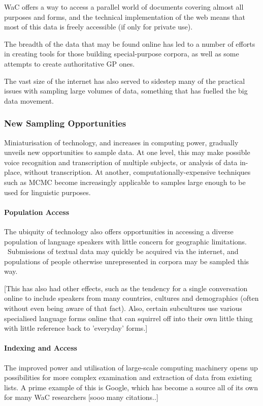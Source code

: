 WaC offers a way to access a parallel world of documents covering almost all purposes and forms, and the technical implementation of the web means that most of this data is freely accessible (if only for private use).

The breadth of the data that may be found online has led to a number of efforts in creating tools for those building special-purpose corpora, as well as some attempts to create authoritative GP ones.

The vast size of the internet has also served to sidestep many of the practical issues with sampling large volumes of data, something that has fuelled the big data movement.  




\subsubsection{New Sampling Opportunities}
Miniaturisation of technology, and increases in computing power, gradually unveils new opportunities to sample data.  At one level, this may make possible voice recognition and transcription of multiple subjects, or analysis of data in-place, without transcription.  At another, computationally-expensive techniques such as MCMC become increasingly applicable to samples large enough to be used for linguistic purposes.


\paragraph{Population Access}
The ubiquity of technology also offers opportunities in accessing a diverse population of language speakers with little concern for geographic limitations.  Submissions of textual data may quickly be acquired via the internet, and populations of people otherwise unrepresented in corpora may be sampled this way.

[This has also had other effects, such as the tendency for a single conversation online to include speakers from many countries, cultures and demographics (often without even being aware of that fact).  Also, certain subcultures use various specialised language forms online that can squirrel off into their own little thing with little reference back to 'everyday' forms.]



\paragraph{Indexing and Access}
The improved power and utilisation of large-scale computing machinery opens up possibilities for more complex examination and extraction of data from existing lists.  A prime example of this is Google, which has become a source all of its own for many WaC researchers [sooo many citations..]

